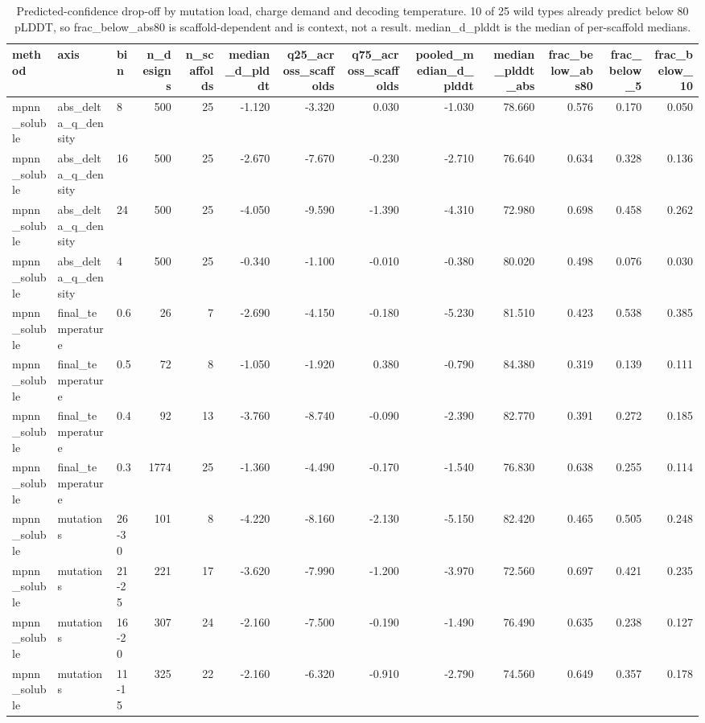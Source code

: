 \begin{table}
\caption{Predicted-confidence drop-off by mutation load, charge demand and decoding temperature. 10 of 25 wild types already predict below 80 pLDDT, so frac_below_abs80 is scaffold-dependent and is context, not a result. median_d_plddt is the median of per-scaffold medians.}
\label{tab:T7_plddt_dropoff}
\begin{tabular}{lllrrrrrrrrrr}
\toprule
method & axis & bin & n\_designs & n\_scaffolds & median\_d\_plddt & q25\_across\_scaffolds & q75\_across\_scaffolds & pooled\_median\_d\_plddt & median\_plddt\_abs & frac\_below\_abs80 & frac\_below\_5 & frac\_below\_10 \\
\midrule
mpnn\_soluble & abs\_delta\_q\_density & 8 & 500 & 25 & -1.120 & -3.320 & 0.030 & -1.030 & 78.660 & 0.576 & 0.170 & 0.050 \\
mpnn\_soluble & abs\_delta\_q\_density & 16 & 500 & 25 & -2.670 & -7.670 & -0.230 & -2.710 & 76.640 & 0.634 & 0.328 & 0.136 \\
mpnn\_soluble & abs\_delta\_q\_density & 24 & 500 & 25 & -4.050 & -9.590 & -1.390 & -4.310 & 72.980 & 0.698 & 0.458 & 0.262 \\
mpnn\_soluble & abs\_delta\_q\_density & 4 & 500 & 25 & -0.340 & -1.100 & -0.010 & -0.380 & 80.020 & 0.498 & 0.076 & 0.030 \\
mpnn\_soluble & final\_temperature & 0.6 & 26 & 7 & -2.690 & -4.150 & -0.180 & -5.230 & 81.510 & 0.423 & 0.538 & 0.385 \\
mpnn\_soluble & final\_temperature & 0.5 & 72 & 8 & -1.050 & -1.920 & 0.380 & -0.790 & 84.380 & 0.319 & 0.139 & 0.111 \\
mpnn\_soluble & final\_temperature & 0.4 & 92 & 13 & -3.760 & -8.740 & -0.090 & -2.390 & 82.770 & 0.391 & 0.272 & 0.185 \\
mpnn\_soluble & final\_temperature & 0.3 & 1774 & 25 & -1.360 & -4.490 & -0.170 & -1.540 & 76.830 & 0.638 & 0.255 & 0.114 \\
mpnn\_soluble & mutations & 26-30 & 101 & 8 & -4.220 & -8.160 & -2.130 & -5.150 & 82.420 & 0.465 & 0.505 & 0.248 \\
mpnn\_soluble & mutations & 21-25 & 221 & 17 & -3.620 & -7.990 & -1.200 & -3.970 & 72.560 & 0.697 & 0.421 & 0.235 \\
mpnn\_soluble & mutations & 16-20 & 307 & 24 & -2.160 & -7.500 & -0.190 & -1.490 & 76.490 & 0.635 & 0.238 & 0.127 \\
mpnn\_soluble & mutations & 11-15 & 325 & 22 & -2.160 & -6.320 & -0.910 & -2.790 & 74.560 & 0.649 & 0.357 & 0.178 \\

\end{tabular}
\end{table}
